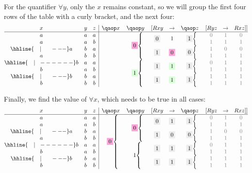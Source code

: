 \documentclass[PHIL101-Textbook.tex]{subfiles}
\begin{document}
\noindent For the quantifier $\forall y$, only the $x$ remains constant, so we will group the first four rows of the table with a curly bracket, and the next four:
\[
\begin{array}{@{}ccc|cccccccc@{}}
  x & y & z & \qa x & \qa y & [\atom R {xy} & \eif & \qa z & [\atom R {yz} & \eif & \atom R {xz}]]\\ \hline
  a & a & a & &\brax{4}{\FF}&\mrow{2}{\GF}&\mrow{2}{\vT}&\brax{2}{\GT}& \gF & \gT & \gF \\
  a & a & b & &&  &&& \gT & \gT & \gT \\
				\hhline{~~~|~~~~~---}
  a & b & a & &&\mrow{2}{\GT}&\mrow{2}{\FF}&\brax{2}{\GF}& \gT & \gF & \gF \\
  a & b & b & &&  &&& \gT & \gT & \gT \\
				\hhline{~~~|~~------}
  b & a & a & &\brax{4}{\TT}&\mrow{2}{\GT}&\mrow{2}{\TT}&\brax{2}{\GT}& \gF & \gT & \gT \\
  b & a & b & &&  &&& \gT & \gT & \gT \\
				\hhline{~~~|~~~~~---}
  b & b & a & &&\mrow{2}{\GT}&\mrow{2}{\TT}&\brax{2}{\GT}& \gT & \gT & \gT \\
  b & b & b & &&  &&& \gT & \gT & \gT \\\end{array}
\]

\noindent Finally, we find the value of $\forall x$, which needs to be true in all cases: 
\[
\begin{array}{@{}ccc|cccccccc@{}}
  x & y & z & \qa x & \qa y & [\atom R {xy} & \eif & \qa z & [\atom R {yz} & \eif & \atom R {xz}]]\\ \hline
a & a & a &\brax{8}{\FF} &\brax{4}{\FF}&\mrow{2}{\GF}&\mrow{2}{\GT}&\brax{2}{\GT}& \gF & \gT & \gF \\
  a & a & b & &&  &&& \gT & \gT & \gT \\
				\hhline{~~~|~~~~~---}
  a & b & a & &&\mrow{2}{\GT}&\mrow{2}{\GF}&\brax{2}{\GF}& \gT & \gF & \gF \\
  a & b & b & &&  &&& \gT & \gT & \gT \\
				\hhline{~~~|~~------}
  b & a & a & &\brax{4}{\vT}&\mrow{2}{\GT}&\mrow{2}{\GT}&\brax{2}{\GT}& \gF & \gT & \gT \\
  b & a & b & &&  &&& \gT & \gT & \gT \\
				\hhline{~~~|~~~~~---}
  b & b & a & &&\mrow{2}{\GT}&\mrow{2}{\GT}&\brax{2}{\GT}& \gT & \gT & \gT \\
  b & b & b & &&  &&& \gT & \gT & \gT \\\end{array}
\]
\end{document}
